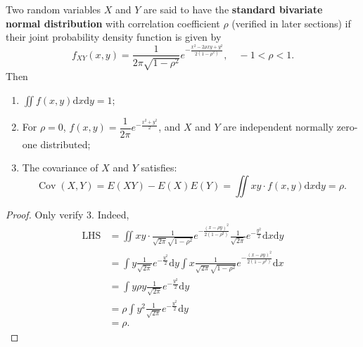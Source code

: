 \documentclass[11pt,singlecolumn, openany, citestyle=authoryear]{elegantbook}
\begin{document}
\begin{CJK}{UTF8}{gbsn}
\begin{example}
    Two random variables $X$ and $Y$
 are said to have the \textbf{standard bivariate normal distribution} with correlation 
 coefficient $\rho$ (verified in later sections) if their joint probability density function is given by
    $$f_{XY}(x,y)=\frac{1}{2\pi \sqrt{1-\rho^2}} e^{-\frac{x^2-2\rho xy + y^2}{2(1-\rho^2)}},
    \quad -1 < \rho <1.$$
    Then 
    \begin{enumerate}
        \item $\displaystyle \iint f(x,y)\mathrm{d}x\mathrm{d}y=1$;
        \item For $\rho=0$, $f(x,y)=\dfrac{1}{2\pi}e^{-\frac{x^2+y^2}{2}}$, and 
        $X$ and $Y$ are independent normally zero-one distributed;
        \item The covariance of $X$ and $Y$ satisfies:
        $$
        \operatorname{Cov}(X,Y)=E(XY)-E(X)E(Y)=\iint xy \cdot f(x,y)\mathrm{d}x\mathrm{d}y =\rho.
        $$
    \end{enumerate}
\end{example}
\begin{proof}
    Only verify 3. Indeed, 
    \begin{align*}
        \text{LHS}&=\iint xy \cdot \frac{1}{\sqrt{2\pi}\sqrt{1-\rho^2}} e^{-\frac{(x-\rho y)^2}
    {2(1-\rho^2)}} \frac{1}{\sqrt{2\pi}}e^{-\frac{y^2}{2}}\mathrm{d}x\mathrm{d}y\\
    &= \int y \frac{1}{\sqrt{2\pi}}e^{-\frac{y^2}{2}} \mathrm{d}y \int x 
    \frac{1}{\sqrt{2\pi}\sqrt{1-\rho^2}} e^{-\frac{(x-\rho y)^2}
    {2(1-\rho^2)}} \mathrm{d}x \\
    &= \int y \rho y  \frac{1}{\sqrt{2\pi}}e^{-\frac{y^2}{2}} \mathrm{d}y \\
    &= \rho \int y^2 \frac{1}{\sqrt{2\pi}}e^{-\frac{y^2}{2}} \mathrm{d}y\\
    &=\rho.
    \end{align*}
\end{proof}


\end{CJK}
\end{document}
